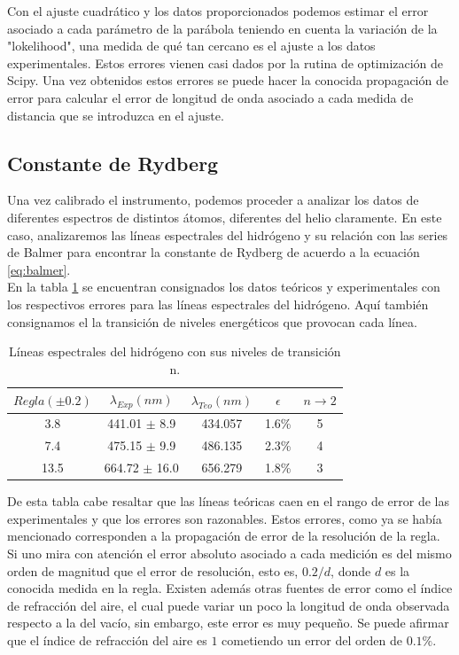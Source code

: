 \documentclass[%
 reprint,
 amsmath,amssymb,
 aps,
]{revtex4-1}
\begin{document}
Con el ajuste cuadrático y los datos proporcionados podemos estimar el error asociado a cada parámetro de la parábola teniendo en cuenta la variación de la "lokelihood", una medida de qué tan cercano es el ajuste a los datos experimentales. Estos errores vienen casi dados por la rutina de optimización de Scipy. Una vez obtenidos estos errores se puede hacer la conocida propagación de error para calcular el error de longitud de onda asociado a cada medida de distancia que se introduzca en el ajuste.\\

\subsection{\label{sec:level2}Constante de Rydberg}
Una vez calibrado el instrumento, podemos proceder a analizar los datos de diferentes espectros de distintos átomos, diferentes del helio claramente. En este caso, analizaremos las líneas espectrales del hidrógeno y su relación con las series de Balmer para encontrar la constante de Rydberg de acuerdo a la ecuación \ref{eq:balmer}.\\

En la tabla \ref{table:hidrogeno} se encuentran consignados los datos teóricos y experimentales con los respectivos errores para las líneas espectrales del hidrógeno. Aquí también consignamos el la transición de niveles energéticos que provocan cada línea.\\

\begin{table}[h!]
\centering
 \begin{tabular}{|c|c|c|c|c|} 
 \hline
 $Regla (\pm0.2) $ & $\lambda_{Exp} (nm)$ & $\lambda_{Teo} (nm)$ & $\epsilon$ & $ n \rightarrow 2 $\\ [0.5ex] 
 \hline\hline
3.8 &	441.01 $\pm$ 8.9 & 434.057 & 1.6\% & 5\\
7.4 &	475.15 $\pm$ 9.9 & 486.135 & 2.3\% & 4\\
13.5 &	664.72 $\pm$ 16.0& 656.279 & 1.8\% & 3\\
[1ex] 
 \hline
 \end{tabular}
 \caption{Líneas espectrales del hidrógeno con sus niveles de transición n.}
 \label{table:hidrogeno}
\end{table}

De esta tabla cabe resaltar que las líneas teóricas caen en el rango de error de las experimentales y que los errores son razonables. Estos errores, como ya se había mencionado corresponden a la propagación de error de la resolución de la regla. Si uno mira con atención el error absoluto asociado a cada medición es del mismo orden de magnitud que el error de resolución, esto es, $0.2/d$, donde $d$ es la conocida medida en la regla. Existen además otras fuentes de error como el índice de refracción del aire, el cual puede variar un poco la longitud de onda observada respecto a la del vacío, sin embargo, este error es muy pequeño. Se puede afirmar que el índice de refracción del aire es $1$ cometiendo un error del orden de $0.1\%$.\\
\end{document}
